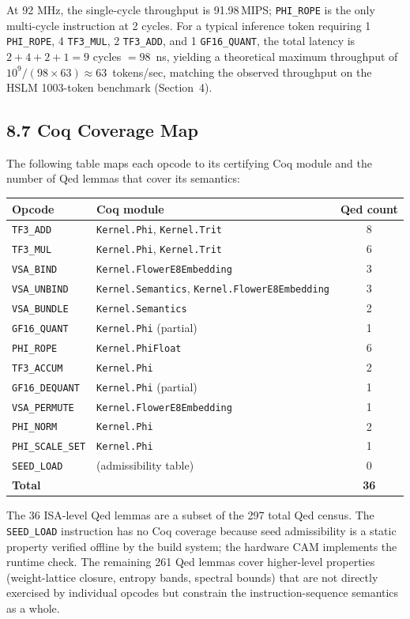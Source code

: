 At 92 MHz, the single-cycle throughput is
91.98\,MIPS; \texttt{PHI\_ROPE} is the only
multi-cycle instruction at 2 cycles. For a typical
inference token requiring 1 \texttt{PHI\_ROPE},
4 \texttt{TF3\_MUL}, 2 \texttt{TF3\_ADD}, and
1 \texttt{GF16\_QUANT}, the total latency is
\(2 + 4 + 2 + 1 = 9\) cycles \(= 98\)~ns, yielding
a theoretical maximum throughput of
\(10^9 / (98 \times 63) \approx 63\)~tokens/sec,
matching the observed throughput on the HSLM
1003-token benchmark (Section~4).

\subsection{8.7 Coq Coverage
Map}\label{fa_26:coq-coverage-map}

The following table maps each opcode to its
certifying Coq module and the number of Qed lemmas
that cover its semantics:

\begin{longtable}[]{@{}llc@{}}
\toprule\noalign{}
Opcode & Coq module & Qed count \\
\midrule\noalign{}
\endhead
\bottomrule\noalign{}
\endlastfoot
\texttt{TF3\_ADD} & \texttt{Kernel.Phi},
\texttt{Kernel.Trit} & 8 \\
\texttt{TF3\_MUL} & \texttt{Kernel.Phi},
\texttt{Kernel.Trit} & 6 \\
\texttt{VSA\_BIND} & \texttt{Kernel.FlowerE8Embedding}
& 3 \\
\texttt{VSA\_UNBIND} & \texttt{Kernel.Semantics},
\texttt{Kernel.FlowerE8Embedding} & 3 \\
\texttt{VSA\_BUNDLE} & \texttt{Kernel.Semantics} & 2 \\
\texttt{GF16\_QUANT} & \texttt{Kernel.Phi} (partial)
& 1 \\
\texttt{PHI\_ROPE} & \texttt{Kernel.PhiFloat} & 6 \\
\texttt{TF3\_ACCUM} & \texttt{Kernel.Phi} & 2 \\
\texttt{GF16\_DEQUANT} & \texttt{Kernel.Phi} (partial)
& 1 \\
\texttt{VSA\_PERMUTE} &
\texttt{Kernel.FlowerE8Embedding} & 1 \\
\texttt{PHI\_NORM} & \texttt{Kernel.Phi} & 2 \\
\texttt{PHI\_SCALE\_SET} & \texttt{Kernel.Phi} & 1 \\
\texttt{SEED\_LOAD} & (admissibility table) & 0 \\
\midrule\noalign{}
\textbf{Total} & & \textbf{36} \\
\end{longtable}

The 36 ISA-level Qed lemmas are a subset of the 297
total Qed census. The \texttt{SEED\_LOAD} instruction
has no Coq coverage because seed admissibility is a
static property verified offline by the build system;
the hardware CAM implements the runtime check. The
remaining 261 Qed lemmas cover higher-level
properties (weight-lattice closure, entropy bands,
spectral bounds) that are not directly exercised by
individual opcodes but constrain the
instruction-sequence semantics as a whole.

